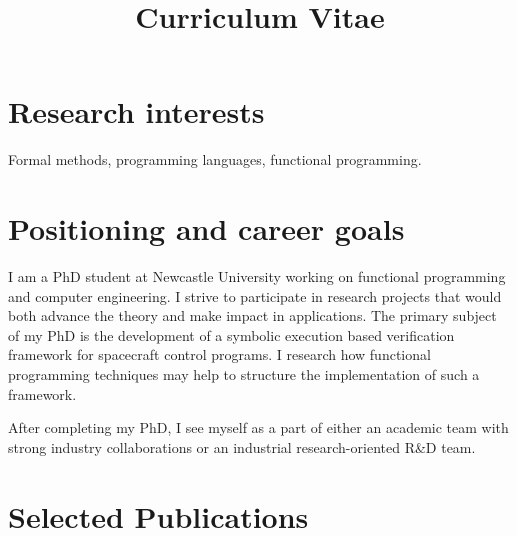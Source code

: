 \documentclass[12pt,a4paper,sans]{moderncv} %
\title{Curriculum Vitae}
\begin{document}

\makecvtitle %

\vspace{-18mm}
\section{Research interests}

\vspace{-2mm}
Formal methods, programming languages, functional programming. %

\vspace{-3mm}
\section{Positioning and career goals}
\vspace{-2mm}

I am a PhD student at Newcastle University working on functional programming and computer engineering. I strive to participate in research projects that would both advance the theory and make impact in applications. The primary subject of my PhD is the development of a symbolic execution based verification framework for spacecraft control programs. I research how functional programming techniques may help to structure the implementation of such a framework. 

\setlength\parindent{24pt} After completing my PhD, I see myself as a part of either an academic team with strong industry collaborations or an industrial research-oriented R\&D team.

\setlength\parindent{0pt} 

\vspace{-3mm}
\section{Selected Publications}
\end{document}
